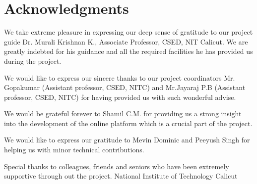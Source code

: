\cleardoublepage
{}
{}
\chapter*{Acknowledgments}
\vspace{1.0in}
We take extreme pleasure in expressing our deep sense of gratitude to our project guide Dr. Murali Krishnan K., Associate Professor, CSED, NIT Calicut. We are greatly indebted for his guidance and all the required facilities he has provided us during the project.

We would like to express our sincere thanks to our project coordinators Mr. Gopakumar (Assistant professor, CSED, NITC) and Mr.Jayaraj P.B (Assistant professor, CSED, NITC) for having provided us with such wonderful advise.
  
We would be grateful forever to Shamil C.M. for providing us a strong insight into the development of the online platform which is a crucial part of the project.

We would like to express our gratitude to Mevin Dominic and Peeyush Singh for helping us with minor technical contributions. 

Special thanks to colleagues, friends and seniors who have been extremely supportive through out the project.  
{National Institute of Technology Calicut}\\
\newpage